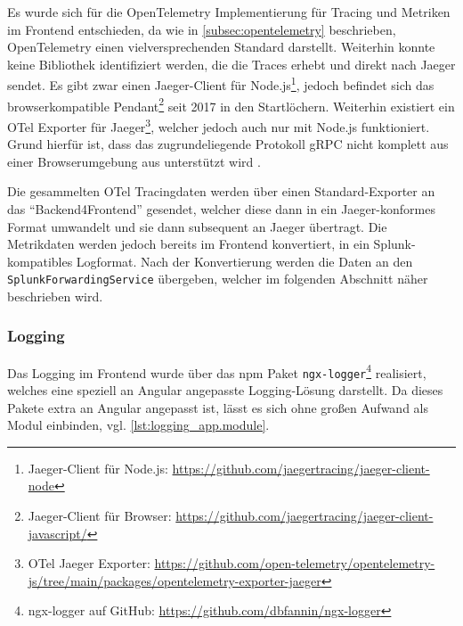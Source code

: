 

Es wurde sich für die OpenTelemetry Implementierung für Tracing und Metriken im Frontend entschieden, da wie in \autoref{subsec:opentelemetry} beschrieben, OpenTelemetry einen vielversprechenden Standard darstellt. Weiterhin konnte keine Bibliothek identifiziert werden, die die Traces erhebt und direkt nach Jaeger sendet. Es gibt zwar einen Jaeger-Client für Node.js\footnote{Jaeger-Client für Node.js: \url{https://github.com/jaegertracing/jaeger-client-node}}, jedoch befindet sich das browserkompatible Pendant\footnote{Jaeger-Client für Browser: \url{https://github.com/jaegertracing/jaeger-client-javascript/}} seit 2017 in den Startlöchern. Weiterhin existiert ein OTel Exporter für Jaeger\footnote{OTel Jaeger Exporter: \url{https://github.com/open-telemetry/opentelemetry-js/tree/main/packages/opentelemetry-exporter-jaeger}}, welcher jedoch auch nur mit Node.js funktioniert. Grund hierfür ist, dass das zugrundeliegende Protokoll gRPC \cite{grpc} nicht komplett aus einer Browserumgebung aus unterstützt wird \cite{grpcWebLimitations}.


Die gesammelten OTel Tracingdaten werden über einen Standard-Exporter an das \enquote{Backend4Frontend} gesendet, welcher diese dann in ein Jaeger-konformes Format umwandelt und sie dann subsequent an Jaeger übertragt. Die Metrikdaten werden jedoch bereits im Frontend konvertiert, in ein Splunk-kompatibles Logformat. Nach der Konvertierung werden die Daten an den \texttt{SplunkForwardingService} übergeben, welcher im folgenden Abschnitt näher beschrieben wird.

\subsubsection{Logging}

Das Logging im Frontend wurde über das npm \cite{NPM} Paket \texttt{ngx-logger}\footnote{ngx-logger auf GitHub: \url{https://github.com/dbfannin/ngx-logger}} realisiert, welches eine speziell an Angular angepasste Logging-Lösung darstellt. Da dieses Pakete extra an Angular angepasst ist, lässt es sich ohne großen Aufwand als Modul einbinden, vgl. \autoref{lst:logging_app.module}.

